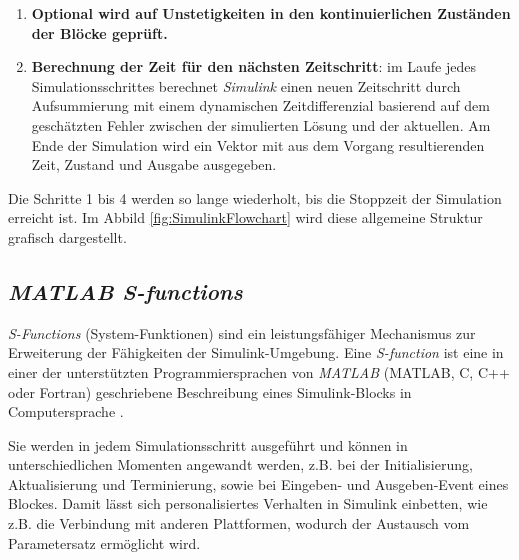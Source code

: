 \begin{enumerate}
    \item \textbf{Optional wird auf Unstetigkeiten in den kontinuierlichen Zuständen der Blöcke geprüft.}
    \item \textbf{Berechnung der Zeit für den nächsten Zeitschritt}: im Laufe jedes Simulationsschrittes berechnet \textit{Simulink} einen neuen Zeitschritt durch Aufsummierung mit einem dynamischen Zeitdifferenzial basierend auf dem geschätzten Fehler zwischen der simulierten Lösung und der aktuellen. Am Ende der Simulation wird ein Vektor mit aus dem Vorgang resultierenden Zeit, Zustand und Ausgabe ausgegeben. \cite{SimulationPhasesDynamic}
\end{enumerate}

Die Schritte 1 bis 4 werden so lange wiederholt, bis die Stoppzeit der Simulation erreicht ist. Im Abbild \ref{fig:SimulinkFlowchart} wird diese allgemeine Struktur grafisch dargestellt. 


\subsection{\textit{MATLAB S-functions}}
\textit{S-Functions} (System-Funktionen) sind ein leistungsfähiger Mechanismus zur Erweiterung der Fähigkeiten der Simulink-Umgebung. Eine \textit{S-function} ist eine in einer der unterstützten Programmiersprachen von \textit{MATLAB} (MATLAB, C, C++ oder Fortran) geschriebene Beschreibung eines Simulink-Blocks in Computersprache  \cite{themathworksinc.WhatSFunctionMATLAB}.

Sie werden in jedem Simulationsschritt ausgeführt und können in unterschiedlichen Momenten angewandt werden, z.B. bei der Initialisierung, Aktualisierung und Terminierung, sowie bei Eingeben- und Ausgeben-Event eines Blockes. Damit lässt sich personalisiertes Verhalten in Simulink einbetten, wie z.B. die Verbindung mit anderen Plattformen, wodurch der Austausch vom Parametersatz ermöglicht wird.

